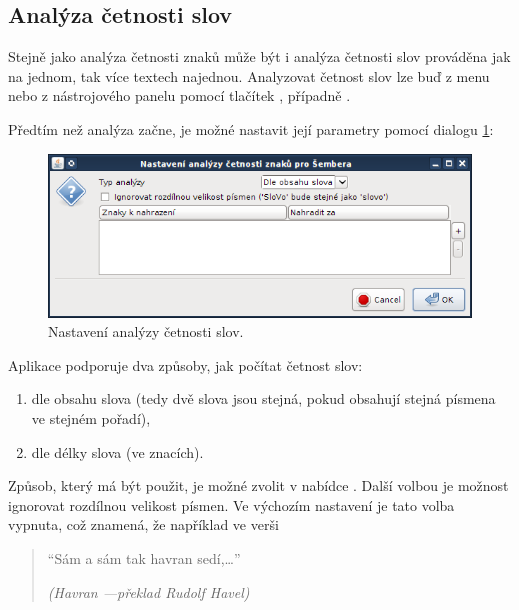 \documentclass[dp.tex]{subfiles}
\begin{document}
\subsection{Analýza četnosti slov}

Stejně jako analýza četnosti znaků může být i analýza četnosti slov prováděna jak na jednom, tak více textech najednou. Analyzovat četnost slov lze buď z menu  nebo z nástrojového panelu pomocí tlačítek , případně .

Předtím než analýza začne, je možné nastavit její parametry pomocí dialogu \ref{fig:gui-word-analysis-dialog}:
\begin{figure}[H]
\centering
\includegraphics[max width=\textwidth,keepaspectratio=true]{imgs-60-aplikace/gui-word-analysis-dialog}
\caption{Nastavení analýzy četnosti slov.}
\label{fig:gui-word-analysis-dialog}
\end{figure}

Aplikace podporuje dva způsoby, jak počítat četnost slov:

\begin{enumerate}
\item dle obsahu slova (tedy dvě slova jsou stejná, pokud obsahují stejná písmena ve stejném pořadí),
\item dle délky slova (ve znacích).
\end{enumerate}

Způsob, který má být použit, je možné zvolit v nabídce . Další volbou je možnost ignorovat rozdílnou velikost písmen. Ve výchozím nastavení je tato volba vypnuta, což znamená, že například ve verši

\begin{verse}
\enquote{Sám a sám tak havran sedí,\ldots}
\begin{flushright}
\textit{(Havran ---překlad Rudolf Havel)}
\end{flushright}
\end{verse}
\end{document}
